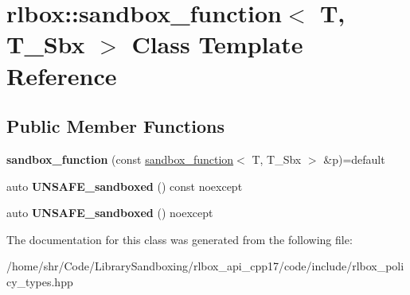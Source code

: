 \hypertarget{classrlbox_1_1sandbox__function}{}\section{rlbox\+:\+:sandbox\+\_\+function$<$ T, T\+\_\+\+Sbx $>$ Class Template Reference}
\label{classrlbox_1_1sandbox__function}
\subsection*{Public Member Functions}
\begin{DoxyCompactItemize}
\item 
\mbox{\label{classrlbox_1_1sandbox__function_a97d573b01f258b6917d389a77903a714}} 
{\bfseries sandbox\+\_\+function} (const \hyperlink{classrlbox_1_1sandbox__function}{sandbox\+\_\+function}$<$ T, T\+\_\+\+Sbx $>$ \&p)=default
\item 
\mbox{\label{classrlbox_1_1sandbox__function_ac1f134d8ddb67fd125a87473a24a0876}} 
auto {\bfseries U\+N\+S\+A\+F\+E\+\_\+sandboxed} () const noexcept
\item 
\mbox{\label{classrlbox_1_1sandbox__function_a62c3e3a78fb0dc0ab87f0aed3a871e51}} 
auto {\bfseries U\+N\+S\+A\+F\+E\+\_\+sandboxed} () noexcept
\end{DoxyCompactItemize}


The documentation for this class was generated from the following file\+:\begin{DoxyCompactItemize}
\item 
/home/shr/\+Code/\+Library\+Sandboxing/rlbox\+\_\+api\+\_\+cpp17/code/include/rlbox\+\_\+policy\+\_\+types.\+hpp\end{DoxyCompactItemize}
